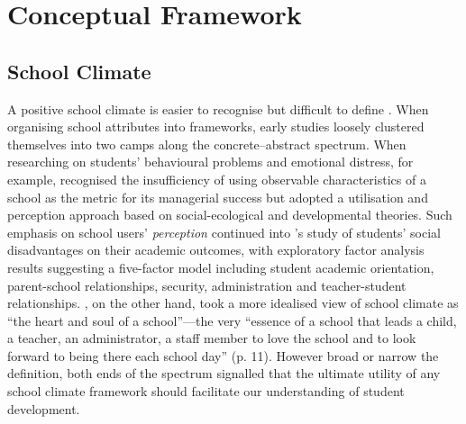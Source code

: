 \documentclass[a4paper,11pt,UKenglish,twoside,openright]{report}\usepackage[]{graphicx}\usepackage[]{color}
\begin{document}

\chapter{Conceptual Framework}
\label{chp:2}






\section{School Climate}\label{sec:sc}

A positive school climate is easier to recognise but difficult to define \parencite{PISAvol3}. When organising school attributes into frameworks, early studies loosely clustered themselves into two camps along the concrete--abstract spectrum. When researching on students' behavioural problems and emotional distress, for example, \textcite{kuperminc:1997} recognised the insufficiency of using observable characteristics of a school as the metric for its managerial success but adopted a utilisation and perception approach based on social-ecological and developmental theories. Such emphasis on school users' \emph{perception} continued into \textcite{esposito:1999}'s study of students' social disadvantages on their academic outcomes, with exploratory factor analysis results suggesting a five-factor model including student academic orientation, parent-school relationships, security, administration and teacher-student relationships. \textcite{freiberg:1999}, on the other hand, took a more idealised view of school climate as ``the heart and soul of a school''---the very ``essence of a school that leads a child, a teacher, an administrator, a staff member to love the school and to look forward to being there each school day'' (p. 11). However broad or narrow the definition, both ends of the spectrum signalled that the ultimate utility of any school climate framework should facilitate our understanding of student development.
\end{document}
